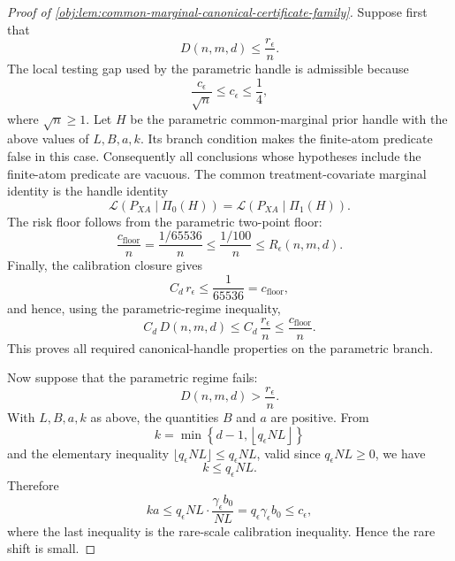 \documentclass[11pt]{article}
\begin{document}
\begin{proof}[Proof of \cref{obj:lem:common-marginal-canonical-certificate-family}]
Suppose first that
\[
D(n,m,d)\le \frac{r_\epsilon}{n}.
\]
The local testing gap used by the parametric handle is admissible because
\[
\frac{c_\epsilon}{\sqrt n}\le c_\epsilon\le \frac14,
\]
where \(\sqrt n\ge1\).  Let \(H\) be the parametric common-marginal prior handle with the above values of \(L,B,a,k\).  Its branch condition makes the finite-atom predicate false in this case.  Consequently all conclusions whose hypotheses include the finite-atom predicate are vacuous.  The common treatment-covariate marginal identity is the handle identity
\[
\mathcal L(P_{XA}\mid \Pi_0(H))
=
\mathcal L(P_{XA}\mid \Pi_1(H)).
\]
The risk floor follows from the parametric two-point floor:
\[
\frac{c_{\mathrm{floor}}}{n}
=
\frac{1/65536}{n}
\le
\frac{1/100}{n}
\le
R_\epsilon(n,m,d).
\]
Finally, the calibration closure gives
\[
C_d\,r_\epsilon\le \frac1{65536}=c_{\mathrm{floor}},
\]
and hence, using the parametric-regime inequality,
\[
C_d\,D(n,m,d)
\le
C_d\,\frac{r_\epsilon}{n}
\le
\frac{c_{\mathrm{floor}}}{n}.
\]
This proves all required canonical-handle properties on the parametric branch. %

Now suppose that the parametric regime fails:
\[
D(n,m,d)>\frac{r_\epsilon}{n}.
\]
With \(L,B,a,k\) as above, the quantities \(B\) and \(a\) are positive.  From
\[
k=\min\left\{d-1,\left\lfloor q_\epsilon NL\right\rfloor\right\}
\]
and the elementary inequality \(\lfloor q_\epsilon NL\rfloor\le q_\epsilon NL\), valid since \(q_\epsilon NL\ge0\), we have
\[
k\le q_\epsilon NL.
\]
Therefore
\[
ka
\le
q_\epsilon NL\cdot
\frac{\gamma_\epsilon b_0}{NL}
=
q_\epsilon\gamma_\epsilon b_0
\le c_\epsilon,
\]
where the last inequality is the rare-scale calibration inequality.  Hence the rare shift is small. %


\end{proof}
\end{document}
